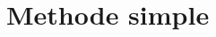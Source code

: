 \documentclass[0_Main.tex]{subfiles}
\begin{document}
\chapter{Methode simple}










\clearpage
\end{document}
